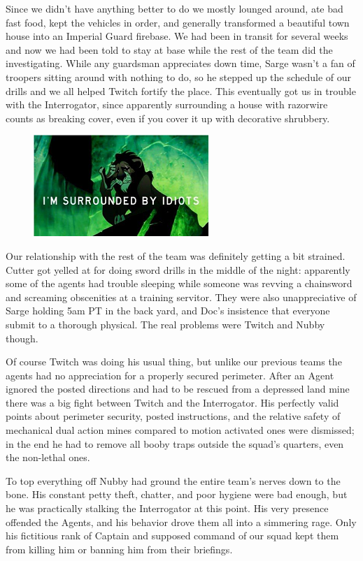 Since we didn’t have anything better to do we mostly lounged around, ate bad fast food, kept the vehicles in order, and generally transformed a beautiful town house into an Imperial Guard firebase. 
We had been in transit for several weeks and now we had been told to stay at base while the rest of the team did the investigating. 
While any guardsman appreciates down time, Sarge wasn’t a fan of troopers sitting around with nothing to do, so he stepped up the schedule of our drills and we all helped Twitch fortify the place. 
This eventually got us in trouble with the Interrogator, since apparently surrounding a house with razorwire counts as breaking cover, even if you cover it up with decorative shrubbery.

\begin{figure}
	\begin{center}
		\includegraphics[width=\figwidth]{pics/5/7.png}
	\end{center}
\end{figure}
Our relationship with the rest of the team was definitely getting a bit strained. Cutter got yelled at for doing sword drills in the middle of the night:
apparently some of the agents had trouble sleeping while someone was revving a chainsword and screaming obscenities at a training servitor. 
They were also unappreciative of Sarge holding 5am PT in the back yard, and Doc’s insistence that everyone submit to a thorough physical. 
The real problems were Twitch and Nubby though.

Of course Twitch was doing his usual thing, but unlike our previous teams the agents had no appreciation for a properly secured perimeter. 
After an Agent ignored the posted directions and had to be rescued from a depressed land mine there was a big fight between Twitch and the Interrogator. 
His perfectly valid points about perimeter security, posted instructions, and the relative safety of mechanical dual action mines compared to motion activated ones were dismissed; 
in the end he had to remove all booby traps outside the squad’s quarters, even the non-lethal ones.

To top everything off Nubby had ground the entire team’s nerves down to the bone. 
His constant petty theft, chatter, and poor hygiene were bad enough, but he was practically stalking the Interrogator at this point. 
His very presence offended the Agents, and his behavior drove them all into a simmering rage. 
Only his fictitious rank of Captain and supposed command of our squad kept them from killing him or banning him from their briefings.

